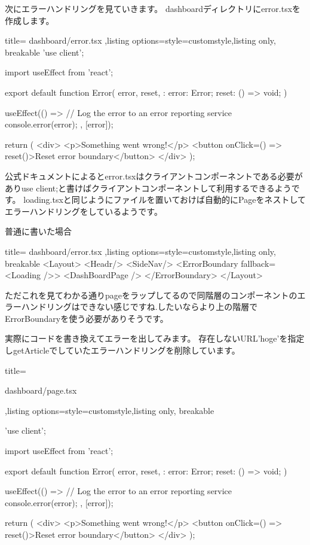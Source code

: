 次にエラーハンドリングを見ていきます。
dashboardディレクトリにerror.tsxを作成します。


\begin{tcblisting}{title={
        dashboard/error.tsx
      },listing options={style=customstyle},listing only, breakable}
'use client';

import { useEffect } from 'react';

export default function Error({
  error,
  reset,
}: {
  error: Error;
  reset: () => void;
  }) {
  useEffect(() => {
  // Log the error to an error reporting service
  console.error(error);
  }, [error]);

  return (
  <div>
    <p>Something went wrong!</p>
    <button onClick={() => reset()}>Reset error boundary</button>
  </div>
  );
}
\end{tcblisting}



公式ドキュメントによるとerror.tsxはクライアントコンポーネントである必要がありuse client;と書けばクライアントコンポーネントして利用するできるようです。
loading.tsxと同じようにファイルを置いておけば自動的にPageをネストしてエラーハンドリングをしているようです。

普通に書いた場合


\begin{tcblisting}{title={
  dashboard/error.tsx
},listing options={style=customstyle},listing only, breakable}
<Layout>
    <Headr/>
    <SideNav/>
    <ErrorBoundary fallback={<Loading />}>
      <DashBoardPage />
    </ErrorBoundary>
</Layout>
\end{tcblisting}



ただこれを見てわかる通りpageをラップしてるので同階層のコンポーネントのエラーハンドリングはできない感じですね.したいならより上の階層でErrorBoundaryを使う必要がありそうです。

実際にコードを書き換えてエラーを出してみます。
存在しないURL'hoge'を指定しgetArticleでしていたエラーハンドリングを削除しています。


\begin{tcblisting}{title={

        dashboard/page.tsx
      },listing options={style=customstyle},listing only, breakable}

'use client';

import { useEffect } from 'react';
      
export default function Error({
  error,
  reset,
}: {
  error: Error;
  reset: () => void;
}) {
  useEffect(() => {
    // Log the error to an error reporting service
    console.error(error);
  }, [error]);
      
  return (
    <div>
      <p>Something went wrong!</p>
      <button onClick={() => reset()}>Reset error boundary</button>
    </div>
  );
}

\end{tcblisting}


